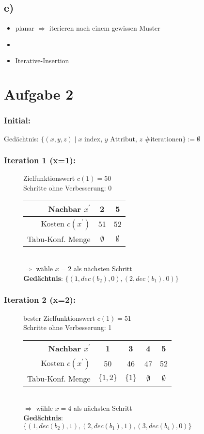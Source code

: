 \documentclass[12pt]{article}
\begin{document}
	\subsection*{e)}
	\begin{itemize}
		\item planar $\Rightarrow$ iterieren nach einem gewissen Muster
		\item 
		\item Iterative-Insertion
	\end{itemize}

	\section*{Aufgabe 2}
	
	\subsubsection*{Initial:}
	Gedächtnis: $\{(x,y,z)\mid x \text{ index, } y \text{ Attribut, } z \text{ \# iterationen}\}:=\emptyset$
	
	\subsubsection*{Iteration 1 (x=1):}
	\begin{figure}[H]
		
		Zielfunktionswert $c(1)=50$\\
		Schritte ohne Verbesserung: 0\\
		\begin{tabular}{r | cc}
			Nachbar $x^\prime$ & 2 & 5 \\ \hline
			Kosten $c(x^\prime)$ & 51 & 52 \\ \hline
			Tabu-Konf. Menge & $\emptyset$ & $\emptyset$ \\
		\end{tabular}\\
		$\Rightarrow $ wähle $x=2$ als nächsten Schritt\\
		\textbf{Gedächtnis}: $\{(1, dec(b_2),0), (2, dec(b_1),0)\}$
	\end{figure}
	
	\subsubsection*{Iteration 2 (x=2):}
	\begin{figure}[H]
		\centering
		bester Zielfunktionswert $c(1)=51$\\
		Schritte ohne Verbesserung: 1\\
		\begin{tabular}{r | cccc}
			Nachbar $x^\prime$   & 1 		& 3		& 4 	& 5	\\ \hline
			Kosten $c(x^\prime)$ & 50 		& 46	& 47	& 52 \\\hline
			Tabu-Konf. Menge     & $\{1,2\}$& $\{1\}$& $\emptyset$ & $\emptyset$\\
		\end{tabular}\\
		$\Rightarrow $ wähle $x=4$ als nächsten Schritt\\
		\textbf{Gedächtnis}: $\{(1,dec(b_2),1), (2,dec(b_1),1), (3, dec(b_4),0)\}$
	\end{figure}
\end{document}
